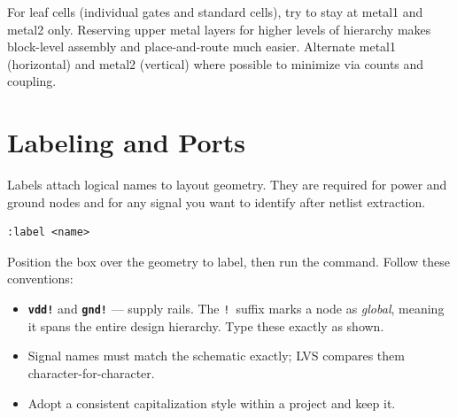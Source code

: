 \documentclass[11pt]{article}
\begin{document}
For leaf cells (individual gates and standard cells), try to stay at
metal1 and metal2 only.
Reserving upper metal layers for higher levels of hierarchy makes
block-level assembly and place-and-route much easier.
Alternate metal1 (horizontal) and metal2 (vertical) where possible to
minimize via counts and coupling.

\section{Labeling and Ports}

Labels attach logical names to layout geometry.
They are required for power and ground nodes and for any signal you
want to identify after netlist extraction.

\begin{lstlisting}
:label <name>
\end{lstlisting}

Position the box over the geometry to label, then run the command.
Follow these conventions:

\begin{itemize}[leftmargin=2em]
  \item \textbf{\texttt{vdd!}} and \textbf{\texttt{gnd!}} --- supply
        rails.
        The \texttt{!}\ suffix marks a node as \emph{global}, meaning
        it spans the entire design hierarchy.
        Type these exactly as shown.
  \item Signal names must match the schematic exactly; LVS compares
        them character-for-character.
  \item Adopt a consistent capitalization style within a project and
        keep it.
\end{itemize}
\end{document}
